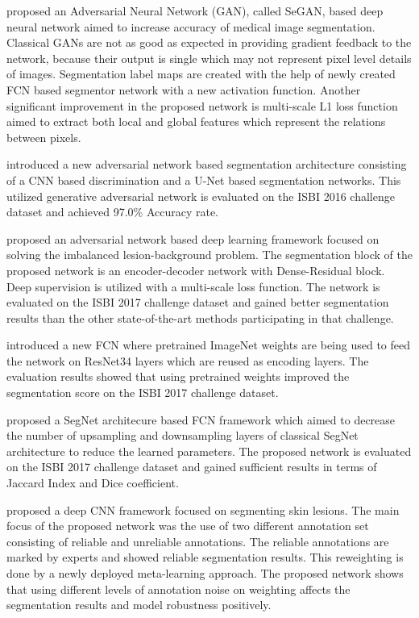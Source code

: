     \citet{xue2018adversarial} proposed an Adversarial Neural Network (GAN), called SeGAN, based deep neural network aimed to increase accuracy of medical image segmentation.
    Classical GANs are not as good as expected in providing gradient feedback to the network, because their output is single which may not represent pixel level details of images.
    Segmentation label maps are created with the help of newly created FCN based segmentor network with a new activation function.
    Another significant improvement in the proposed network is multi-scale L1 loss function aimed to extract both local and global features which represent the relations between pixels.

    \citet{peng2019segmentation} introduced a new adversarial network based segmentation architecture consisting of a CNN based discrimination and a U-Net based segmentation networks.
    This utilized generative adversarial network is evaluated on the ISBI 2016 challenge dataset and achieved 97.0\% Accuracy rate.

    \citet{tu2019segmentation} proposed an adversarial network based deep learning framework focused on solving the imbalanced lesion-background problem.
    The segmentation block of the proposed network is an encoder-decoder network with Dense-Residual block. Deep supervision is utilized with a multi-scale loss function.
    The network is evaluated on the ISBI 2017 challenge dataset and gained better segmentation results than the other state-of-the-art methods participating in that challenge.

    \citet{tschandl2019domain} introduced a new FCN where pretrained ImageNet weights are being used to feed the network on ResNet34 layers which are reused as encoding layers.
    The evaluation results showed that using pretrained weights improved the segmentation score on the ISBI 2017 challenge dataset.

    \citet{ninh2019skin} proposed a SegNet architecure based FCN framework
    which aimed to decrease the number of upsampling and downsampling layers of classical SegNet architecture to reduce the learned parameters.
    The proposed network is evaluated on the ISBI 2017 challenge dataset and gained sufficient results in terms of Jaccard Index and Dice coefficient.

    \citet{mirikharaji2019learning} proposed a deep CNN framework focused on segmenting skin lesions.
    The main focus of the proposed network was the use of two different annotation set consisting of reliable and unreliable annotations.
    The reliable annotations are marked by experts and showed reliable segmentation results. This reweighting is done by a newly deployed meta-learning approach.
    The proposed network shows that using different levels of annotation noise on weighting affects the segmentation results and model robustness positively.

